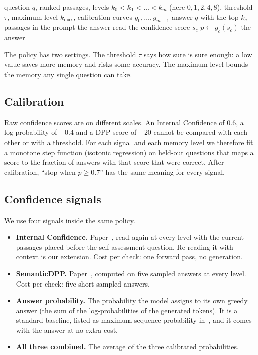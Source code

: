 \documentclass[11pt,a4paper]{article}
\begin{document}
\begin{algorithm}[H]
\caption{Uncertainty-Calibrated Allocation for one question}
\label{alg:uca}
\begin{algorithmic}[1]
\Require question $q$, ranked passages, levels $k_0<k_1<\dots<k_m$ (here $0,1,2,4,8$),
threshold $\tau$, maximum level $k_{\max}$, calibration curves $g_0,\dots,g_{m-1}$
  \State answer $q$ with the top $k_c$ passages in the prompt
   \Return the answer \EndIf
  \State read the confidence score $s_c$
  \State $p \gets g_c(s_c)$ 
   \Return the answer \EndIf
\EndFor
\end{algorithmic}
\end{algorithm}

The policy has two settings. The threshold $\tau$ says how sure is sure enough:
a low value saves more memory and risks some accuracy. The maximum level bounds
the memory any single question can take.

\subsection{Calibration}

Raw confidence scores are on different scales. An Internal Confidence of 0.6, a
log-probability of $-0.4$ and a DPP score of $-20$ cannot be compared with each
other or with a threshold. For each signal and each memory level we therefore
fit a monotone step function (isotonic regression) on held-out questions that
maps a score to the fraction of answers with that score that were correct.
After calibration, ``stop when $p \ge 0.7$'' has the same meaning for every
signal.

\subsection{Confidence signals}

We use four signals inside the same policy.
\begin{itemize}
\item \textbf{Internal Confidence.} Paper~\cite{chen2026query}, read again at
every level with the current passages placed before the self-assessment
question. Re-reading it with context is our extension. Cost per check: one
forward pass, no generation.
\item \textbf{SemanticDPP.} Paper~\cite{semanticdpp2026}, computed on five
sampled answers at every level. Cost per check: five short sampled answers.
\item \textbf{Answer probability.} The probability the model assigns to its own
greedy answer (the sum of the log-probabilities of the generated tokens). It is
a standard baseline, listed as maximum sequence probability
in~\cite{chen2026query}, and it comes with the answer at no extra cost.
\item \textbf{All three combined.} The average of the three calibrated
probabilities.
\end{itemize}
\end{document}
